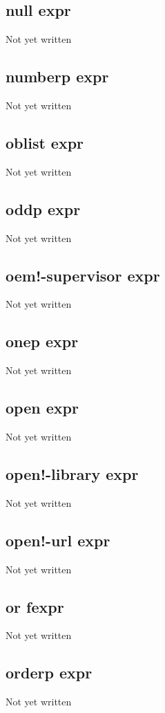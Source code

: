 \documentclass[a4paper,11pt]{article}
\begin{document}
\subsection{\ttfamily null expr}
Not yet written

\subsection{\ttfamily numberp expr}
Not yet written

\subsection{\ttfamily oblist expr}
Not yet written

\subsection{\ttfamily oddp expr}
Not yet written

\subsection{\ttfamily oem!-supervisor expr}
Not yet written

\subsection{\ttfamily onep expr}
Not yet written

\subsection{\ttfamily open expr}
Not yet written

\subsection{\ttfamily open!-library expr}
Not yet written

\subsection{\ttfamily open!-url expr}
Not yet written

\subsection{\ttfamily or fexpr}
Not yet written

\subsection{\ttfamily orderp expr}
Not yet written
\end{document}
